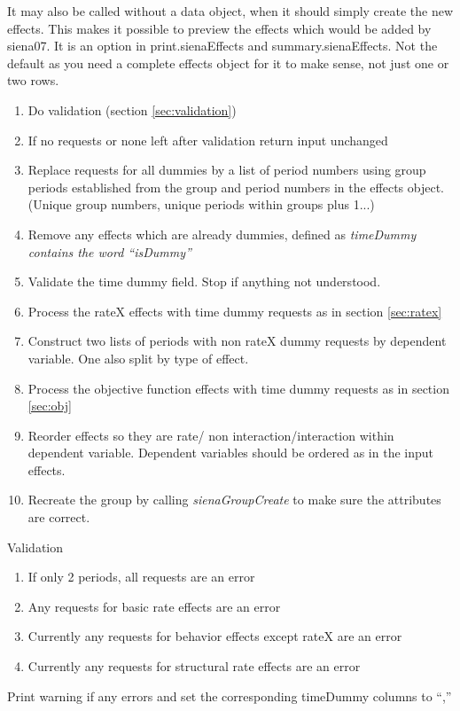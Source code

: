 \documentclass[12pt,a4paper]{article}
\makeatletter
\renewcommand{\=}{\,=\,}
\newcommand{\+}{\,+\,}
\newcommand{\nnm}[1]{\textsf{\small\textit{#1}}}
\renewcommand{\subsection}{\@startsection{subsection}{2}
                {0pt}{0.7\baselineskip}{0.3\baselineskip}
                {\sffamily} }
\makeatother
\begin{document}
It may also be called without a data object, when it should simply create the
new effects. This makes it possible to preview the effects which would be added
by siena07. It is an option in print.sienaEffects and summary.sienaEffects. Not
the default as you need a complete effects object for it to make sense, not just
one or two rows.
\begin{enumerate}
\item Do validation (section \ref{sec:validation})
\item If no requests or none left after validation return input unchanged
\item Replace requests for all dummies by a list of period numbers using group
periods established from the group and period numbers in the effects
object. (Unique group numbers, unique periods within groups plus 1...)
\item Remove any effects which are already dummies, defined as
 \emph{timeDummy contains the word ``isDummy''}
\item Validate the time dummy field. Stop if anything not understood.
\item Process the rateX effects with time dummy requests as in section
  \ref{sec:ratex}
\item Construct two lists of periods with non rateX dummy requests by dependent
variable. One also split by type of effect.
\item Process the objective function effects with time dummy requests as in
  section \ref{sec:obj}
\item Reorder effects so they are rate/ non interaction/interaction within
dependent variable. Dependent variables should be ordered as in the input
effects.
\item Recreate the group by calling \nnm{sienaGroupCreate}
to make sure the attributes are correct.
\end{enumerate}

\subsection{Validation}
\label{sec:validation}
\begin{enumerate}
\item If only 2 periods, all requests are an error
\item Any requests for basic rate effects are an error
\item Currently any requests for behavior effects except rateX are an error
\item Currently any requests for structural rate effects are an error
\end{enumerate}
Print warning if any errors and set the corresponding timeDummy columns to ``,''
\end{document}
